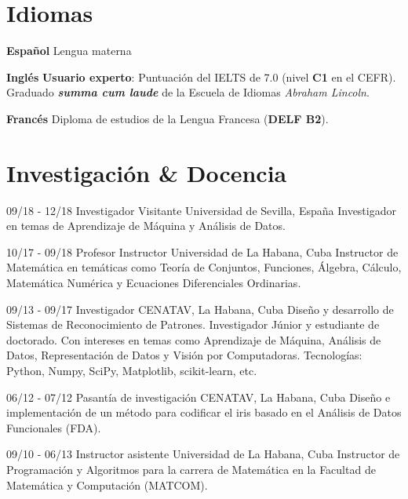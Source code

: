 \documentclass[]{friggeri-cv}
\begin{document}
\section{Idiomas}
\begin{entrylist}
  \entry
    {\textbf{Español}}
    {}
    {}
    {Lengua materna}      

  \entry
    {\textbf{Inglés}}
    {}
    {}
    {
		\textbf{Usuario experto}: Puntuación del IELTS de 7.0 (nivel \textbf{C1} en el CEFR).\\    
    	Graduado \textbf{\emph{summa cum laude}} de la Escuela de Idiomas \emph{Abraham Lincoln}.
    }

  \entry
    {\textbf{Francés}}
    {}
    {}
    {Diploma de estudios de la Lengua Francesa (\textbf{DELF B2}).}
\end{entrylist}


\section{Investigación \& Docencia}
\begin{entrylist}
  \entry
    {09/18 - 12/18}
    {Investigador Visitante}
    {Universidad de Sevilla, España}
    {Investigador en temas de Aprendizaje de Máquina y Análisis de Datos.\\}

  \entry
    {10/17 - 09/18}
    {Profesor Instructor}
    {Universidad de La Habana, Cuba}
    {Instructor de Matemática en temáticas como Teoría de Conjuntos, Funciones, Álgebra, Cálculo, Matemática Numérica y Ecuaciones Diferenciales Ordinarias.\\}
\end{entrylist}

\begin{entrylist}
  \entry
    {09/13 - 09/17}
    {Investigador}
    {CENATAV, La Habana, Cuba}
    {Diseño y desarrollo de Sistemas de Reconocimiento de Patrones. Investigador Júnior y estudiante de doctorado. Con intereses en temas como Aprendizaje de Máquina, Análisis de Datos, Representación de Datos y Visión por Computadoras. Tecnologías: Python, Numpy, SciPy, Matplotlib, scikit-learn, etc.\\}

  \entry
    {06/12 - 07/12}
    {Pasantía de investigación}
    {CENATAV, La Habana, Cuba}
    {Diseño e implementación de un método para codificar el iris basado en el Análisis de Datos Funcionales (FDA).\\}

  \entry
    {09/10 - 06/13}
    {Instructor asistente}
    {Universidad de La Habana, Cuba}
    {Instructor  de Programación y Algoritmos para la carrera de Matemática en la Facultad de Matemática y Computación (MATCOM).\\}
\end{entrylist}
\end{document}
